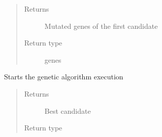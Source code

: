 \documentclass[letterpaper,10pt,english]{sphinxmanual}
\begin{document}
\begin{fulllineitems}
\begin{fulllineitems}
\begin{quote}
\begin{description}
\item[{Returns}] \leavevmode
\sphinxAtStartPar
Mutated genes of the first candidate

\item[{Return type}] \leavevmode
\sphinxAtStartPar
genes

\end{description}\end{quote}

\end{fulllineitems}


\begin{fulllineitems}
\label{\detokenize{genetic:genetic.Genetic.run}}
\sphinxAtStartPar
Starts the genetic algorithm execution
\begin{quote}\begin{description}
\item[{Returns}] \leavevmode
\sphinxAtStartPar
Best candidate

\item[{Return type}] \leavevmode
\sphinxAtStartPar
{\hyperref[\detokenize{genetic:genetic.Chromosome}]{}}

\end{description}\end{quote}

\end{fulllineitems}



\end{fulllineitems}
\end{document}
